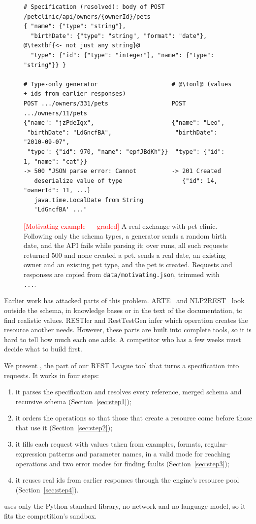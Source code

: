 \begin{figure}[t]
\begin{lstlisting}[numbers=none,escapechar=@,basicstyle=\ttfamily\scriptsize]
# Specification (resolved): body of POST /petclinic/api/owners/{ownerId}/pets
{ "name": {"type": "string"},
  "birthDate": {"type": "string", "format": "date"},  @\textbf{<- not just any string}@
  "type": {"id": {"type": "integer"}, "name": {"type": "string"}} }

# Type-only generator                     # @\tool@ (values + ids from earlier responses)
POST .../owners/331/pets                  POST .../owners/11/pets
{"name": "jzPdeIgx",                      {"name": "Leo",
 "birthDate": "LdGncfBA",                  "birthDate": "2010-09-07",
 "type": {"id": 970, "name": "epfJBdKh"}}  "type": {"id": 1, "name": "cat"}}
-> 500 "JSON parse error: Cannot          -> 201 Created
   deserialize value of type                 {"id": 14, "ownerId": 11, ...}
   java.time.LocalDate from String
   'LdGncfBA' ..."
\end{lstlisting}
\caption{\textcolor{red}{[Motivating example --- graded]} A real exchange with
  pet-clinic. Following only the schema types, a generator sends a random
  birth date, and the API fails while parsing it; over \NReps runs, all
  \NMotivBaselineRequests such requests returned 500 and none created a pet.
  \tool sends a real date, an existing owner and an existing pet type, and
  the pet is created. Requests and responses are copied from
  \texttt{data/motivating.json}, trimmed with \texttt{...}.}
\label{fig:motivating}
\end{figure}

Earlier work has attacked parts of this problem. ARTE~\cite{arte} and
NLP2REST~\cite{nlp2rest} look outside the schema, in knowledge bases or in
the text of the documentation, to find realistic values. RESTler and
RestTestGen infer which operation creates the resource another needs.
However, these parts are built into complete tools, so it is hard to tell
how much each one adds. A competitor who has a few weeks must decide what to
build first.

We present \tool, the part of our REST League tool that turns a
specification into requests. It works in four steps:
\begin{enumerate}
  \item it parses the specification and resolves every reference, merged
    schema and recursive schema (Section~\ref{sec:step1});
  \item it orders the operations so that those that create a resource come
    before those that use it (Section~\ref{sec:step2});
  \item it fills each request with values taken from examples, formats,
    regular-expression patterns and parameter names, in a valid mode for
    reaching operations and two error modes for finding faults
    (Section~\ref{sec:step3});
  \item it reuses real ids from earlier responses through the engine's
    resource pool (Section~\ref{sec:step4}).
\end{enumerate}
\tool uses only the Python standard library, no network and no language
model, so it fits the competition's sandbox.

